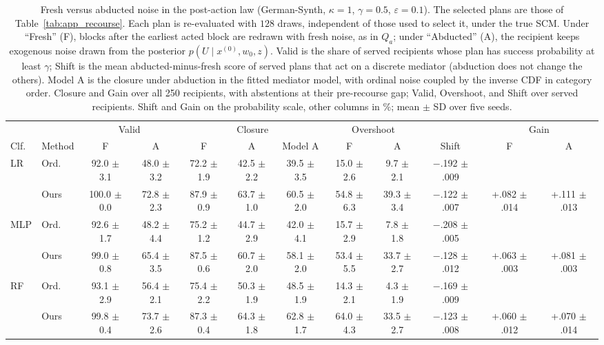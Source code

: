 \begin{table}[t]
\centering
\footnotesize
\caption{Fresh versus abducted noise in the post-action law (German-Synth,
$\kappa=1$, $\gamma=0.5$, $\varepsilon=0.1$). The selected plans are those of
Table~\ref{tab:app_recourse}. Each plan is re-evaluated with $128$ draws,
independent of those used to select it, under the true SCM. Under ``Fresh''
(F), blocks after the earliest acted block are redrawn with fresh noise, as in
$Q_a$; under ``Abducted'' (A), the recipient keeps exogenous noise drawn from
the posterior $p(U\mid x^{(0)},w_0,z)$. Valid is the share of served
recipients whose plan has success probability at least $\gamma$; Shift is
the mean abducted-minus-fresh score of served plans that act on a discrete
mediator (abduction does not change the others). Model A is the closure
under abduction in the fitted mediator model, with ordinal noise coupled by
the inverse CDF in category order. Closure and Gain over all 250 recipients,
with abstentions at their pre-recourse gap; Valid, Overshoot, and Shift over
served recipients. Shift and Gain on the probability scale, other columns in
\%; mean $\pm$ SD over five seeds.}
\label{tab:app_abduction}
\setlength{\tabcolsep}{1.5pt}
\begin{tabular}{ll cc ccc cc c cc}
\hline
& & \multicolumn{2}{c}{Valid} & \multicolumn{3}{c}{Closure} &
\multicolumn{2}{c}{Overshoot} & & \multicolumn{2}{c}{Gain} \\
Clf. & Method & F & A & F & A & Model A & F & A & Shift & F & A \\
\hline
LR & Ord. & 92.0 $\pm$ 3.1 & 48.0 $\pm$ 3.2 & 72.2 $\pm$ 1.9 & 42.5 $\pm$ 2.2 & 39.5 $\pm$ 3.5 & 15.0 $\pm$ 2.6 & 9.7 $\pm$ 2.1 & $-$.192 $\pm$ .009 &  &  \\
 & Ours & 100.0 $\pm$ 0.0 & 72.8 $\pm$ 2.3 & 87.9 $\pm$ 0.9 & 63.7 $\pm$ 1.0 & 60.5 $\pm$ 2.0 & 54.8 $\pm$ 6.3 & 39.3 $\pm$ 3.4 & $-$.122 $\pm$ .007 & +.082 $\pm$ .014 & +.111 $\pm$ .013 \\
\hline
MLP & Ord. & 92.6 $\pm$ 1.7 & 48.2 $\pm$ 4.4 & 75.2 $\pm$ 1.2 & 44.7 $\pm$ 2.9 & 42.0 $\pm$ 4.1 & 15.7 $\pm$ 2.9 & 7.8 $\pm$ 1.8 & $-$.208 $\pm$ .005 &  &  \\
 & Ours & 99.0 $\pm$ 0.8 & 65.4 $\pm$ 3.5 & 87.5 $\pm$ 0.6 & 60.7 $\pm$ 2.0 & 58.1 $\pm$ 2.0 & 53.4 $\pm$ 5.5 & 33.7 $\pm$ 2.7 & $-$.128 $\pm$ .012 & +.063 $\pm$ .003 & +.081 $\pm$ .003 \\
\hline
RF & Ord. & 93.1 $\pm$ 2.9 & 56.4 $\pm$ 2.1 & 75.4 $\pm$ 2.2 & 50.3 $\pm$ 1.9 & 48.5 $\pm$ 1.9 & 14.3 $\pm$ 2.1 & 4.3 $\pm$ 1.9 & $-$.169 $\pm$ .009 &  &  \\
 & Ours & 99.8 $\pm$ 0.4 & 73.7 $\pm$ 2.6 & 87.3 $\pm$ 0.4 & 64.3 $\pm$ 1.8 & 62.8 $\pm$ 1.7 & 64.0 $\pm$ 4.3 & 33.5 $\pm$ 2.7 & $-$.123 $\pm$ .008 & +.060 $\pm$ .012 & +.070 $\pm$ .014 \\
\hline
\end{tabular}
\end{table}


